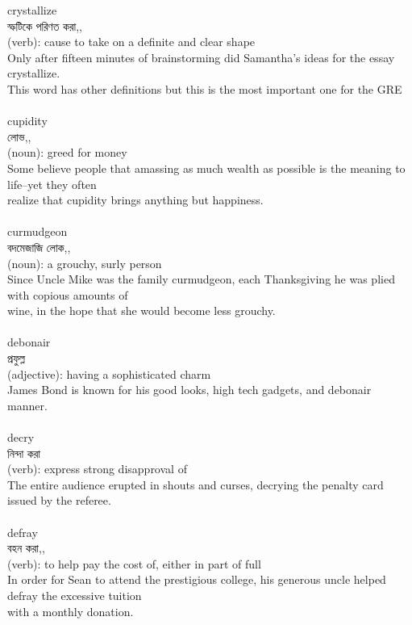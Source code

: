 \documentclass{article}
\begin{document}
{crystallize}\\
{স্ফটিকে পরিণত করা,,}\\
{(verb): cause to take on a definite and clear shape\\Only after fifteen minutes of brainstorming did Samantha's ideas for the essay crystallize.\\This word has other definitions but this is the most important one for the GRE\\}\\
{cupidity}\\
{লোভ,,}\\
{(noun): greed for money\\Some believe people that amassing as much wealth as possible is the meaning to life--yet they often\\realize that cupidity brings anything but happiness.\\}\\
{curmudgeon}\\
{বদমেজাজি লোক,,}\\
{(noun): a grouchy, surly person\\Since Uncle Mike was the family curmudgeon, each Thanksgiving he was plied with copious amounts of\\wine, in the hope that she would become less grouchy.\\}\\
{debonair}\\
{প্রফুল্ল}\\
{(adjective): having a sophisticated charm\\James Bond is known for his good looks, high tech gadgets, and debonair manner.\\}\\
{decry}\\
{নিন্দা করা}\\
{(verb): express strong disapproval of\\The entire audience erupted in shouts and curses, decrying the penalty card issued by the referee.\\}\\
{defray}\\
{বহন করা,,}\\
{(verb): to help pay the cost of, either in part of full\\In order for Sean to attend the prestigious college, his generous uncle helped defray the excessive tuition\\with a monthly donation.\\}\\
\end{document}
